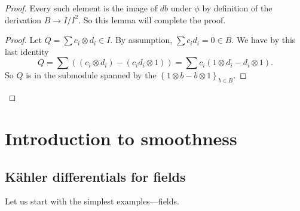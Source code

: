 \begin{proof}
Every such element is the image of $db$ under $\phi$ by definition of the
derivation $B \to I/I^2$. So this lemma will complete the proof.

\begin{proof} 
Let $Q = \sum c_i \otimes d_i \in I$. By assumption, $\sum c_i d_i = 0 \in B$.
We have by this last identity
\[Q =  \sum \left( ( c_i \otimes d_i ) - (c_i d_i \otimes 1)\right)
= \sum c_i (1 \otimes d_i - d_i \otimes 1).
\]
So $Q$ is in the submodule spanned by the $\left\{1 \otimes b - b \otimes
1\right\}_{b \in B}$.
\end{proof} 
\end{proof}

\section{Introduction to smoothness}
\subsection{K\"ahler differentials for fields}

Let us start with the simplest examples---fields.

